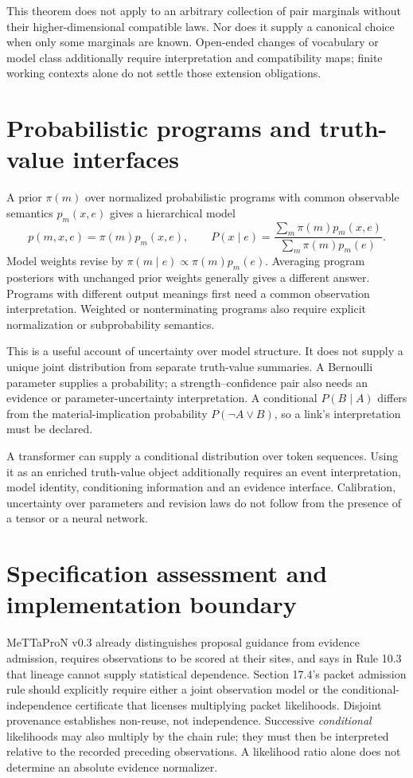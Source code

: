 \documentclass[11pt]{article}
\begin{document}
This theorem does not apply to an arbitrary collection of pair marginals
without their higher-dimensional compatible laws. Nor does it supply a
canonical choice when only some marginals are known. Open-ended changes of
vocabulary or model class additionally require interpretation and compatibility
maps; finite working contexts alone do not settle those extension obligations.

\section{Probabilistic programs and truth-value interfaces}
A prior $\pi(m)$ over normalized probabilistic programs with common observable
semantics $p_m(x,e)$ gives a hierarchical model
\[
 p(m,x,e)=\pi(m)p_m(x,e),\qquad
 P(x\mid e)=\frac{\sum_m\pi(m)p_m(x,e)}{\sum_m\pi(m)p_m(e)}.
\]
Model weights revise by $\pi(m\mid e)\propto\pi(m)p_m(e)$. Averaging program
posteriors with unchanged prior weights generally gives a different answer.
Programs with different output meanings first need a common observation
interpretation. Weighted or nonterminating programs also require explicit
normalization or subprobability semantics.

This is a useful account of uncertainty over model structure. It does not
supply a unique joint distribution from separate truth-value summaries.
A Bernoulli parameter supplies a probability; a strength--confidence pair
also needs an evidence or parameter-uncertainty interpretation. A conditional
$P(B\mid A)$ differs from the material-implication probability
$P(\neg A\lor B)$, so a link's interpretation must be declared.

A transformer can supply a conditional distribution over token sequences.
Using it as an enriched truth-value object additionally requires an event
interpretation, model identity, conditioning information and an evidence
interface. Calibration, uncertainty over parameters and revision laws do not
follow from the presence of a tensor or a neural network.

\section{Specification assessment and implementation boundary}
MeTTaProN v0.3 already distinguishes proposal guidance from evidence admission,
requires observations to be scored at their sites, and says in Rule 10.3 that
lineage cannot supply statistical dependence. Section 17.4's packet admission
rule should explicitly require either a joint observation model or the
conditional-independence certificate that licenses multiplying packet
likelihoods. Disjoint provenance establishes non-reuse, not independence.
Successive \emph{conditional} likelihoods may also multiply by the chain rule;
they must then be interpreted relative to the recorded preceding observations.
A likelihood ratio alone does not determine an absolute evidence normalizer.
\end{document}
